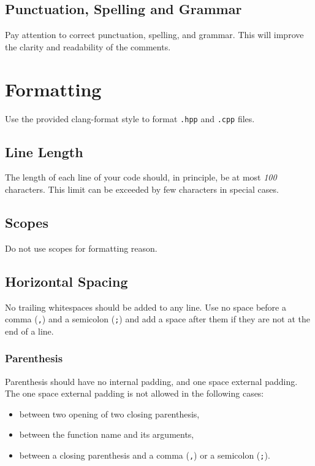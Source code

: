 \documentclass[a4paper]{article}
\newcommand{\inlinecode}[1]{\lstinline|#1|}
\begin{document}
\subsection{Punctuation, Spelling and Grammar}

Pay attention to correct punctuation, spelling, and grammar. This will improve the clarity and readability of the comments.

\section{Formatting}

Use the provided clang-format style to format \verb|.hpp| and \verb|.cpp| files.

\subsection{Line Length}

The length of each line of your code should, in principle, be at most \emph{100} characters.
This limit can be exceeded by few characters in special cases.

\subsection{Scopes}

Do not use scopes for formatting reason.

\subsection{Horizontal Spacing}

No trailing whitespaces should be added to any line.
Use no space before a comma (\inlinecode{,}) and a semicolon (\inlinecode{;}) and add a space after them if they are not at the end of a line.

\subsubsection{Parenthesis}

Parenthesis should have no internal padding, and one space external padding.
The one space external padding is not allowed in the following cases:
\begin{itemize} \itemsep -3pt
 \vspace{-2ex}
 \item between two opening of two closing parenthesis,
 \item between the function name and its arguments,
 \item between a closing parenthesis and a comma (\inlinecode{,}) or a semicolon (\inlinecode{;}).
\end{itemize}
\end{document}
